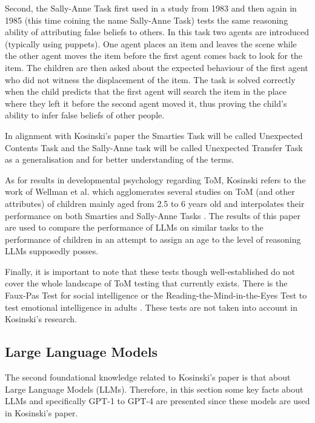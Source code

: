 Second, the Sally-Anne Task first used in a study from 1983 \cite{fb_test_places_1} and then again in 1985 \cite{fb_test_places_2} (this time coining the name Sally-Anne Task) tests the same reasoning ability of attributing false beliefs to others. In this task two agents are introduced (typically using puppets). One agent places an item and leaves the scene while the other agent moves the item before the first agent comes back to look for the item. The children are then asked about the expected behaviour of the first agent who did not witness the displacement of the item. The task is solved correctly when the child predicts that the first agent will search the item in the place where they left it before the second agent moved it, thus proving the child's ability to infer false beliefs of other people. \cite{fb_test_places_1,fb_test_places_2}

In alignment with Kosinski's paper the Smarties Task will be called Unexpected Contents Task and the Sally-Anne task will be called Unexpected Transfer Task as a generalisation and for better understanding of the terms.

As for results in developmental psychology regarding ToM, Kosinski refers to the work of Wellman et al. which agglomerates several studies on ToM (and other attributes) of children mainly aged from 2.5 to 6 years old and interpolates their performance on both Smarties and Sally-Anne Tasks \cite{tom_children_2001}. The results of this paper are used to compare the performance of LLMs on similar tasks to the performance of children in an attempt to assign an age to the level of reasoning LLMs supposedly posses.

Finally, it is important to note that these tests though well-established do not cover the whole landscape of ToM testing that currently exists. There is the Faux-Pas Test for social intelligence \cite{tom_test2} or the Reading-the-Mind-in-the-Eyes Test to test emotional intelligence in adults \cite{tom_test1}. These tests are not taken into account in Kosinski's research.

\subsection{Large Language Models}
The second foundational knowledge related to Kosinski's paper is that about Large Language Models (LLMs). Therefore, in this section some key facts about LLMs and specifically GPT-1 to GPT-4 are presented since these models are used in Kosinski's paper.

